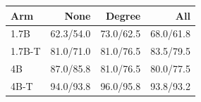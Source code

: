 \begin{tabular}{lrrr}
\toprule
Arm & None & Degree & All \\
\midrule
1.7B & 62.3/54.0 & 73.0/62.5 & 68.0/61.8 \\
1.7B-T & 81.0/71.0 & 81.0/76.5 & 83.5/79.5 \\
4B & 87.0/85.8 & 81.0/76.5 & 80.0/77.5 \\
4B-T & 94.0/93.8 & 96.0/95.8 & 93.8/93.2 \\
\bottomrule
\end{tabular}
